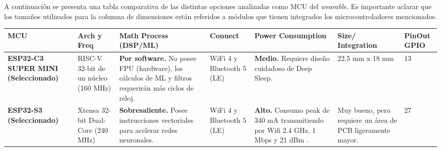 \documentclass[letterpaper,11pt]{article}
\begin{document}
A continuación se presenta una tabla comparativa de las distintas opciones analizadas como MCU del \textit{wearable}. Es importante aclarar que los tamaños utilizados para la columna de dimensiones están referidos a módulos que tienen integrados los microcontroladores mencionados.
\begin{table}[H]
    \centering
    \renewcommand{\arraystretch}{1.3}
    \begin{tabular}{|L{2.5 cm}|L{2.5 cm}|L{2.5 cm}|L{2 cm}|L{2 cm}|L{2 cm}|L{1.7 cm}|}
        \hline
        \textbf{MCU}                                                                                                           & \textbf{Arch y Freq}                 & \textbf{Math Process (DSP/ML)}                                                                               & \textbf{Connect}                                  & \textbf{Power Consumption}                                                              & \textbf{Size/ Integration}                                 & \textbf{PinOut GPIO} \\ \hline


        \textbf{ESP32-C3 SUPER MINI (Seleccionado)} \citep{esp32c3_ds}                                                         & RISC-V 32-bit de un núcleo (160 MHz) & \textbf{Por software.} No posee FPU (hardware), los cálculos de ML y filtros requerirán más ciclos de reloj. & WiFi 4 y Bluetooth 5 (LE)                         & \textbf{Medio.} Requiere diseño cuidadoso de Deep Sleep.                                & 22.5 mm x 18 mm                                            & 13                   \\ \hline

        \textbf{ESP32-S3 (Seleccionado)} \citep{esp32s3_ds}                                                                    & Xtensa 32-bit Dual-Core (240 MHz)    & \textbf{Sobresaliente.} Posee instrucciones vectoriales para acelerar redes neuronales.                      & WiFi 4 y Bluetooth 5 (LE)                         & \textbf{Alto.} Consumo peak de 340 mA transmitiendo por Wifi 2.4 GHz, 1 Mbps y 21 dBm . & Muy bueno, pero requiere un área de PCB ligeramente mayor. & 27                   \\ \hline



\end{tabular}
\end{table}
\end{document}

